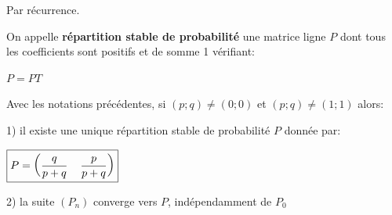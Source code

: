 \documentclass[french]{book}
\begin{document}
  \begin{demo}
  Par récurrence.
\end{demo}   
   
   \begin{defn}
   
   On appelle \textbf{répartition stable de probabilité} une matrice ligne $P$ dont tous les coefficients sont positifs et de somme 1 vérifiant: 
   
   \begin{center}
   $\boxed{P=PT}$
   \end{center}
   
   \end{defn}
   
   \begin{thm}
   Avec les notations précédentes, si $(p;q)\neq (0;0)$ et $(p;q)\neq (1;1)$ alors:
   
   1) il existe une unique répartition stable de probabilité $P$ donnée par:
   
   \begin{center}
   $\boxed{P=\left( \dfrac{q}{p+q}\hspace{0.4cm}\dfrac{p}{p+q}\right) }$
   \end{center}
   
   2) la suite $(P_{n})$ converge vers $P$, indépendamment   de $P_{0}$
   
   \end{thm}
   
\end{document}

